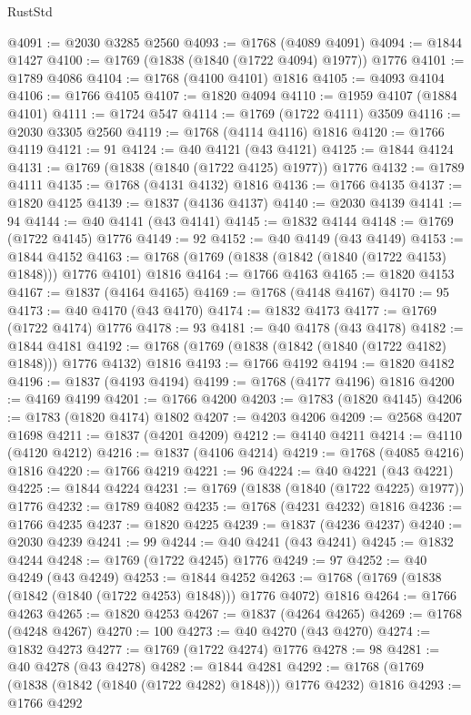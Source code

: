 \begin{lexlean}{RustStd}
\begin{coremodule}
{\begin{coremodule}
{{{{{{{{{{{{{{{{{{{{{{{{{{{{{{{{{{{{{{{{{{{{{{{@4091 := @2030 @3285 @2560
@4093 := @1768 (@4089 @4091)
@4094 := @1844 @1427
@4100 := @1769 (@1838 (@1840 (@1722 @4094) @1977)) @1776
@4101 := @1789 @4086
@4104 := @1768 (@4100 @4101) @1816
@4105 := @4093 @4104
@4106 := @1766 @4105
@4107 := @1820 @4094
@4110 := @1959 @4107 (@1884 @4101)
@4111 := @1724 @547
@4114 := @1769 (@1722 @4111) @3509
@4116 := @2030 @3305 @2560
@4119 := @1768 (@4114 @4116) @1816
@4120 := @1766 @4119
@4121 := 91
@4124 := @40 @4121 (@43 @4121)
@4125 := @1844 @4124
@4131 := @1769 (@1838 (@1840 (@1722 @4125) @1977)) @1776
@4132 := @1789 @4111
@4135 := @1768 (@4131 @4132) @1816
@4136 := @1766 @4135
@4137 := @1820 @4125
@4139 := @1837 (@4136 @4137)
@4140 := @2030 @4139
@4141 := 94
@4144 := @40 @4141 (@43 @4141)
@4145 := @1832 @4144
@4148 := @1769 (@1722 @4145) @1776
@4149 := 92
@4152 := @40 @4149 (@43 @4149)
@4153 := @1844 @4152
@4163 := @1768 (@1769 (@1838 (@1842 (@1840 (@1722 @4153) @1848))) @1776 @4101) @1816
@4164 := @1766 @4163
@4165 := @1820 @4153
@4167 := @1837 (@4164 @4165)
@4169 := @1768 (@4148 @4167)
@4170 := 95
@4173 := @40 @4170 (@43 @4170)
@4174 := @1832 @4173
@4177 := @1769 (@1722 @4174) @1776
@4178 := 93
@4181 := @40 @4178 (@43 @4178)
@4182 := @1844 @4181
@4192 := @1768 (@1769 (@1838 (@1842 (@1840 (@1722 @4182) @1848))) @1776 @4132) @1816
@4193 := @1766 @4192
@4194 := @1820 @4182
@4196 := @1837 (@4193 @4194)
@4199 := @1768 (@4177 @4196) @1816
@4200 := @4169 @4199
@4201 := @1766 @4200
@4203 := @1783 (@1820 @4145)
@4206 := @1783 (@1820 @4174) @1802
@4207 := @4203 @4206
@4209 := @2568 @4207 @1698
@4211 := @1837 (@4201 @4209)
@4212 := @4140 @4211
@4214 := @4110 (@4120 @4212)
@4216 := @1837 (@4106 @4214)
@4219 := @1768 (@4085 @4216) @1816
@4220 := @1766 @4219
@4221 := 96
@4224 := @40 @4221 (@43 @4221)
@4225 := @1844 @4224
@4231 := @1769 (@1838 (@1840 (@1722 @4225) @1977)) @1776
@4232 := @1789 @4082
@4235 := @1768 (@4231 @4232) @1816
@4236 := @1766 @4235
@4237 := @1820 @4225
@4239 := @1837 (@4236 @4237)
@4240 := @2030 @4239
@4241 := 99
@4244 := @40 @4241 (@43 @4241)
@4245 := @1832 @4244
@4248 := @1769 (@1722 @4245) @1776
@4249 := 97
@4252 := @40 @4249 (@43 @4249)
@4253 := @1844 @4252
@4263 := @1768 (@1769 (@1838 (@1842 (@1840 (@1722 @4253) @1848))) @1776 @4072) @1816
@4264 := @1766 @4263
@4265 := @1820 @4253
@4267 := @1837 (@4264 @4265)
@4269 := @1768 (@4248 @4267)
@4270 := 100
@4273 := @40 @4270 (@43 @4270)
@4274 := @1832 @4273
@4277 := @1769 (@1722 @4274) @1776
@4278 := 98
@4281 := @40 @4278 (@43 @4278)
@4282 := @1844 @4281
@4292 := @1768 (@1769 (@1838 (@1842 (@1840 (@1722 @4282) @1848))) @1776 @4232) @1816
@4293 := @1766 @4292
}}}}}}}}}}}}}}}}}}}}}}}}}}}}}}}}}}}}}}}}}}}}}}}
\end{coremodule}}
\end{coremodule}
\end{lexlean}
